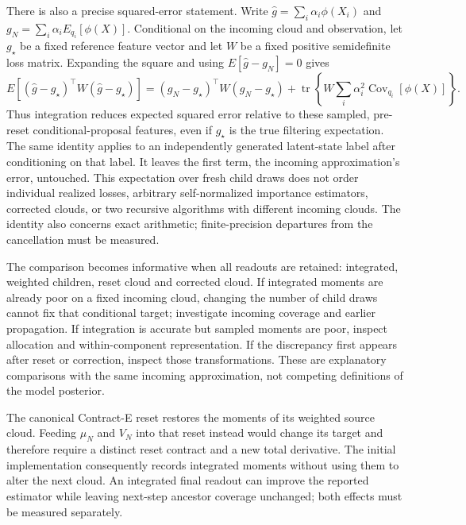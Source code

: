 There is also a precise squared-error statement. Write
$\widehat g=\sum_i\alpha_i\phi(X_i)$ and
$g_N=\sum_i\alpha_i E_{q_i}[\phi(X)]$. Conditional on the incoming cloud
and observation, let $g_\star$ be a fixed reference feature vector and let
$W$ be a fixed positive semidefinite loss matrix. Expanding the square and
using $E[\widehat g-g_N]=0$ gives
\begin{equation}
 E\!\left[(\widehat g-g_\star)^\top W(\widehat g-g_\star)\right]
 =(g_N-g_\star)^\top W(g_N-g_\star)
 +\operatorname{tr}\!\left\{W\sum_i\alpha_i^2
       \operatorname{Cov}_{q_i}[\phi(X)]\right\}.
 \label{eq:parent-integrated-risk}
\end{equation}
Thus integration reduces expected squared error relative to these sampled,
pre-reset conditional-proposal features, even if $g_\star$ is the true
filtering expectation. The same identity applies to an independently generated
latent-state label after conditioning on that label. It leaves the first term,
the incoming approximation's error, untouched. This expectation over fresh
child draws does not order individual realized losses, arbitrary
self-normalized importance estimators, corrected clouds, or two recursive
algorithms with different incoming clouds. The identity also concerns exact
arithmetic; finite-precision departures from the cancellation must be measured.

The comparison becomes informative when all readouts are retained: integrated,
weighted children, reset cloud and corrected cloud. If integrated moments are
already poor on a fixed incoming cloud, changing the number of child draws
cannot fix that conditional target; investigate incoming coverage and earlier
propagation. If integration is accurate but sampled moments are poor, inspect
allocation and within-component representation. If the discrepancy first
appears after reset or correction, inspect those transformations. These are
explanatory comparisons with the same incoming approximation, not competing
definitions of the model posterior.

The canonical Contract-E reset restores the moments of its weighted source
cloud. Feeding $\mu_N$ and $V_N$ into that reset instead would change its
target and therefore require a distinct reset contract and a new total
derivative. The initial implementation consequently records integrated moments
without using them to alter the next cloud. An integrated final readout can
improve the reported estimator while leaving next-step ancestor coverage
unchanged; both effects must be measured separately.

